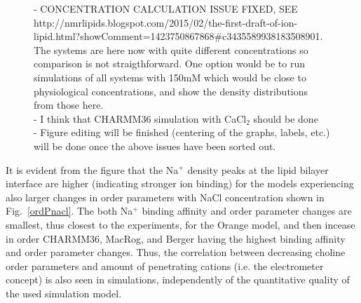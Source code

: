 \documentclass[pre,aps,floatfix,authordate1-4,twocolumn]{revtex4-1}
\begin{document}
\begin{figure}[]
{- CONCENTRATION CALCULATION ISSUE FIXED, SEE http://nmrlipids.blogspot.com/2015/02/the-first-draft-of-ion-lipid.html?showComment=1423750867868\#c3435589938183508901. \\
The systems are here now with quite different concentrations so comparison is not straigthforward. One option would be to run simulations of all
systems with 150mM which would be close to physiological concentrations, and show the density distributions from those here. \\
- I think that CHARMM36 simulation with CaCl$_2$ should be done \\
- Figure editing will be finished (centering of the graphs, labels, etc.) will be done once the above issues have been sorted out.
 }
\end{figure}
It is evident from the figure that the Na$^+$ density peaks at the lipid bilayer interface are higher (indicating stronger ion binding) for the models
experiencing also larger changes in order parameters with NaCl concentration shown in Fig.~\ref{ordPnacl}. 
The both Na$^+$ binding affinity and order parameter changes are smallest, thus closest to the experiments, for the Orange model, and then incease 
in order CHARMM36, MacRog, and Berger having the highest binding affinity and order parameter changes.
Thus, the correlation between decreasing choline order parameters
and amount of penetrating cations (i.e. the electrometer concept) is also seen in simulations, independently of the quantitative quality of the used simulation model.
\end{document}
